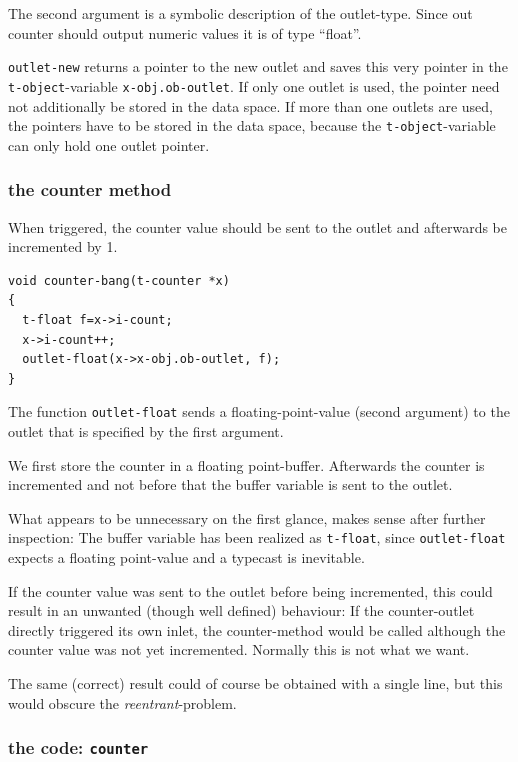 \documentclass{ppgmus}
\begin{document}
The second argument is a symbolic description of the outlet-type.
Since out counter should output numeric values it is of type ``float''.

\verb+outlet-new+ returns a pointer to the new outlet and saves this very pointer
in the \verb+t-object+-variable \verb+x-obj.ob-outlet+.
If only one outlet is used, the pointer need not additionally be stored in the data space.
If more than one outlets are used, the pointers have to be stored in the data space,
because the \verb+t-object+-variable can only hold one outlet pointer.

\subsubsection{the counter method}
When triggered, the counter value should be sent to the outlet
and afterwards be incremented by 1.

\begin{verbatim}
void counter-bang(t-counter *x)
{
  t-float f=x->i-count;
  x->i-count++;
  outlet-float(x->x-obj.ob-outlet, f);
}
\end{verbatim}

The function \verb+outlet-float+ sends a floating-point-value (second argument) to the outlet
that is specified by the first argument.

We first store the counter in a floating point-buffer.
Afterwards the counter is incremented and not before that the buffer variable is sent 
to the outlet.

What appears to be unnecessary on the first glance, makes sense after further
inspection:
The buffer variable has been realized as \verb+t-float+,
since \verb+outlet-float+ expects a floating point-value and a typecast is
inevitable.

If the counter value was sent to the outlet before being incremented,
this could result in an unwanted (though well defined) behaviour:
If the counter-outlet directly triggered its own inlet,
the counter-method would be called although the counter value was not yet incremented.
Normally this is not what we want.

The same (correct) result could of course be obtained with a single line,
but this  would obscure the {\em reentrant}-problem.

\subsubsection{the code: \tt counter}
\end{document}
